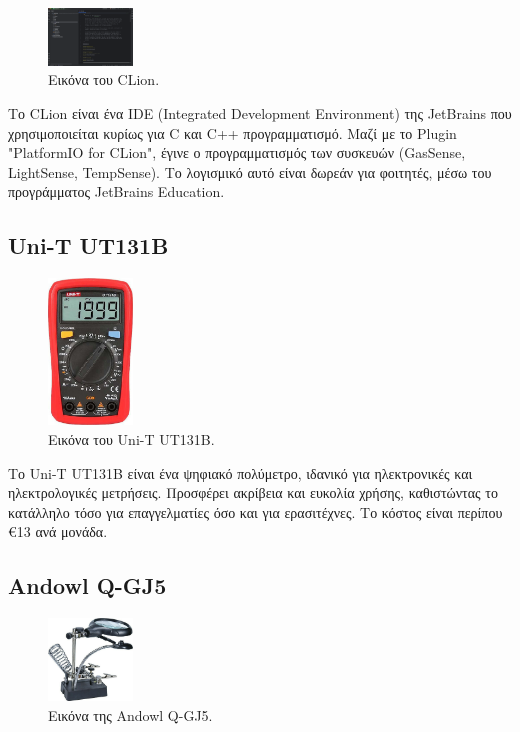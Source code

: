 \documentclass[conference]{IEEEtran}
\begin{document}
\begin{figure}[H]
	\centerline{\includegraphics[width=0.2\textwidth]{assets/clion}}
	\caption{Εικόνα του CLion.}
	\label{Εικόνα του CLion}
\end{figure}

Το CLion είναι ένα IDE (Integrated Development Environment) της JetBrains που χρησιμοποιείται κυρίως για C και C++ προγραμματισμό. Μαζί με το Plugin "PlatformIO for CLion", έγινε ο προγραμματισμός των συσκευών (GasSense, LightSense, TempSense). Το λογισμικό αυτό είναι δωρεάν για φοιτητές, μέσω του προγράμματος JetBrains Education.

\subsection{Uni-T UT131Β}

\begin{figure}[H]
	\centerline{\includegraphics[width=0.2\textwidth]{assets/multimeter}}
	\caption{Εικόνα του Uni-T UT131Β.}
	\label{Εικόνα του Uni-T UT131Β}
\end{figure}

Το Uni-T UT131B είναι ένα ψηφιακό πολύμετρο, ιδανικό για ηλεκτρονικές και ηλεκτρολογικές μετρήσεις. Προσφέρει ακρίβεια και ευκολία χρήσης, καθιστώντας το κατάλληλο τόσο για επαγγελματίες όσο και για ερασιτέχνες. Το κόστος είναι περίπου €13 ανά μονάδα.\cite{miltimeter}

\subsection{Andowl Q-GJ5}

\begin{figure}[H]
	\centerline{\includegraphics[width=0.2\textwidth]{assets/solderstation}}
	\caption{Εικόνα της Andowl Q-GJ5.}
	\label{Εικόνα της Andowl Q-GJ5}
\end{figure}
\end{document}
